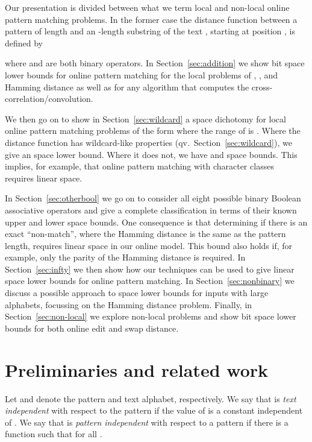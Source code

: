 \documentclass{article}
\theoremstyle{plain}
\theoremstyle{definition}
\begin{document}
Our presentation is divided between what we term local and non-local online pattern matching problems. In the former case the distance function between a pattern  of length  and an -length substring of the text , starting at position , is defined by

where  and  are both binary operators. In Section~\ref{sec:addition} we show  bit space lower bounds for online pattern matching for the local problems of , , and Hamming distance as well as for any algorithm that computes the cross-correlation/convolution.

We then go on to show in Section~\ref{sec:wildcard} a  space dichotomy for local online pattern matching problems of the form 
where the range of  is . Where the distance function  has wildcard-like properties (qv.~Section~\ref{sec:wildcard}), we give an  space lower bound. Where it does not, we have  and  space bounds.  This implies, for example, that online pattern matching with character classes~\cite{LR:2009} requires linear space.

In Section~\ref{sec:otherbool} we go on to consider all eight possible binary Boolean associative operators and give a complete classification in terms of their known upper and lower space bounds.  One consequence is that determining if there is an exact ``non-match'', where the Hamming distance is the same as the pattern length, requires linear space in our online model. This bound also holds if, for example, only the parity of the Hamming distance is required.  In Section~\ref{sec:infty} we then show how our techniques can be used to give linear space lower bounds for   online pattern matching.  In Section~\ref{sec:nonbinary} we discuss a possible approach to space lower bounds for inputs with large alphabets, focussing on the Hamming distance problem. Finally, in Section~\ref{sec:non-local} we explore non-local problems and show  bit space lower bounds for both online edit and swap distance.


\section{Preliminaries and related work}

Let  and  denote the pattern and text alphabet, respectively. We say that  is \emph{text independent} with respect to the pattern  if the value of  is a constant independent of . We say that  is \emph{pattern independent} with respect to a pattern  if there is a function  such that  for all .
\end{document}
